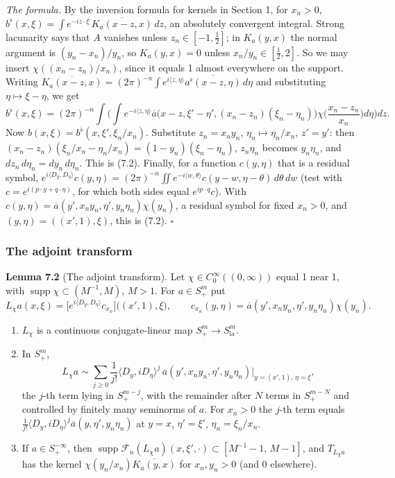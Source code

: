 \documentclass[
  11pt,
]{article}
\begin{document}
\emph{The formula.} By the inversion formula for kernels in Section 1,
for \(x_n>0\),
\(b^\flat(x,\xi)=\int e^{-iz\cdot\xi}\,\overline{K_a(x-z,x)}\,dz\), an
absolutely convergent integral. Strong lacunarity says that \(A\)
vanishes unless \(z_n\in[-1,\tfrac12]\); in \(K_a(y,x)\) the normal
argument is \((y_n-x_n)/y_n\), so \(K_a(y,x)=0\) unless
\(x_n/y_n\in[\tfrac12,2]\). So we may insert \(\chi((x_n-z_n)/x_n)\),
since it equals 1 almost everywhere on the support. Writing
\(\overline{K_a(x-z,x)}=(2\pi)^{-n}\int e^{i\langle z,\eta\rangle}\overline{a^\flat(x-z,\eta)}\,d\eta\)
and substituting \(\eta\mapsto\xi-\eta\), we get \[
b^\flat(x,\xi)=(2\pi)^{-n}\int\!\Big(\int e^{-i\langle z,\eta\rangle}\overline a\big(x-z,\xi'-\eta',(x_n-z_n)(\xi_n-\eta_n)\big)\chi\Big(\frac{x_n-z_n}{x_n}\Big)d\eta\Big)dz .
\] Now \(b(x,\xi)=b^\flat(x,\xi',\xi_n/x_n)\). Substitute
\(z_n=x_ny_n\), \(\eta_n\mapsto\eta_n/x_n\), \(z'=y'\): then
\((x_n-z_n)(\xi_n/x_n-\eta_n/x_n)=(1-y_n)(\xi_n-\eta_n)\), \(z_n\eta_n\)
becomes \(y_n\eta_n\), and \(dz_n\,d\eta_n=dy_n\,d\eta_n\). This is
(7.2). Finally, for a function \(c(y,\eta)\) that is a residual symbol,
\(e^{i\langle D_y,D_\eta\rangle}c(y,\eta)=(2\pi)^{-n}\iint e^{-i\langle w,\theta\rangle}c(y-w,\eta-\theta)\,d\theta\,dw\)
(test with \(c=e^{i(p\cdot y+q\cdot\eta)}\), for which both sides equal
\(e^{ip\cdot q}c\)). With
\(c(y,\eta)=\overline a(y',x_ny_n,\eta',y_n\eta_n)\chi(y_n)\), a
residual symbol for fixed \(x_n>0\), and \((y,\eta)=((x',1),\xi)\), this
is (7.2). \(\square\)

\subsubsection{The adjoint transform}\label{the-adjoint-transform}

\textbf{Lemma 7.2} (The adjoint transform). Let
\(\chi\in C_0^\infty((0,\infty))\) equal 1 near 1, with
\(\operatorname{supp}\chi\subset(M^{-1},M)\), \(M>1\). For
\(a\in S^m_+\) put \[
L_\chi a(x,\xi)=\Big[e^{i\langle D_y,D_\eta\rangle}c_{x_n}\Big]\big((x',1),\xi\big),\qquad c_{x_n}(y,\eta)=\overline a(y',x_ny_n,\eta',y_n\eta_n)\chi(y_n).
\tag{7.4}
\]

\begin{enumerate}
\def\labelenumi{(\alph{enumi})}
\item
  \(L_\chi\) is a continuous conjugate-linear map
  \(S^m_+\to S^m_{\mathrm{la}}\).
\item
  In \(S^m_+\), \[
L_\chi a\sim\sum_{j\geq0}\frac1{j!}\langle D_y,iD_\eta\rangle^j\,\overline a(y',x_ny_n,\eta',y_n\eta_n)\Big|_{y=(x',1),\,\eta=\xi},
\tag{7.5}
\] the \(j\)-th term lying in \(S^{m-j}_+\), with the remainder after
  \(N\) terms in \(S^{m-N}_+\) and controlled by finitely many seminorms
  of \(a\). For \(x_n>0\) the \(j\)-th term equals
  \(\frac1{j!}\langle D_y,iD_\eta\rangle^j\overline a(y,\eta',y_n\eta_n)\)
  at \(y=x\), \(\eta'=\xi'\), \(\eta_n=\xi_n/x_n\).
\item
  If \(a\in S^{-\infty}_+\), then
  \(\operatorname{supp}\mathcal F_n(L_\chi a)(x,\xi',\cdot)\subset[M^{-1}-1,\,M-1]\),
  and \(T_{L_\chi a}\) has the kernel
  \(\chi(y_n/x_n)\overline{K_a(y,x)}\) for \(x_n,y_n>0\) (and 0
  elsewhere).
\end{enumerate}
\end{document}
